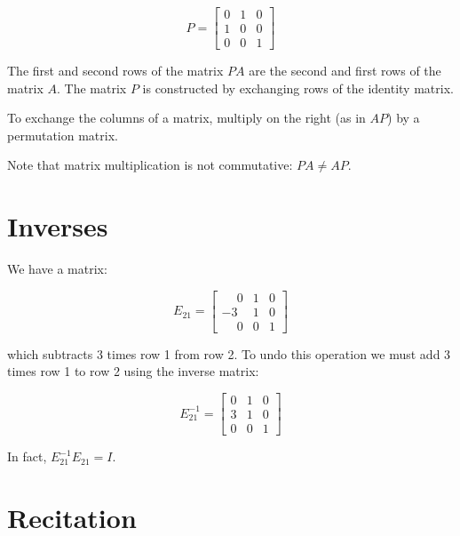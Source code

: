 \documentclass{ximera}
\begin{document}
\[
P=\begin{bmatrix} 0&1&0\\1&0&0\\0&0&1 \end{bmatrix}
\]

The first and second rows of the matrix $PA$ are the second and first rows of the 
matrix $A$. The matrix $P$ is constructed by exchanging rows of the identity matrix.

To exchange the columns of a matrix, multiply on the right (as in $AP$) by a 
permutation matrix.

Note that matrix multiplication is not commutative: $PA \neq AP$.

\section*{Inverses}

We have a matrix:

\[
 E_{21} = \begin{bmatrix} \phantom{-}0&1&0\\-3&1&0\\\phantom{-}0&0&1 \end{bmatrix}
\]

which subtracts 3 times row 1 from row 2. To undo this operation we must add 3 times 
row 1 to row 2 using the inverse matrix:

\[
 E_{21}^{-1} = \begin{bmatrix} 0&1&0\\3&1&0\\0&0&1 \end{bmatrix}
\]


In fact, $ E_{21}^{-1}E_{21} = I$.

\section*{Recitation}
\end{document}
